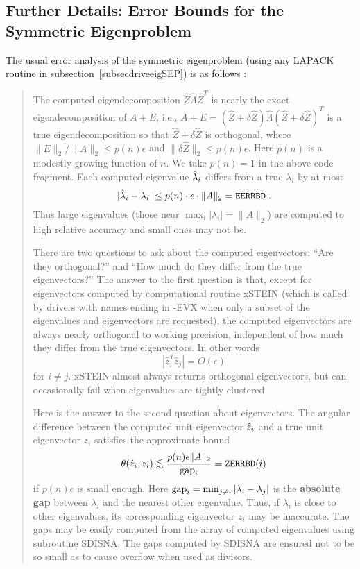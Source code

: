 \subsection{Further Details:  Error Bounds for the Symmetric Eigenproblem }\label{secDetailsym}

The usual error analysis of the
symmetric
eigenproblem (using any LAPACK
routine in subsection~\ref{subsecdriveeigSEP}) is as follows \cite{parlett}:

\begin{quote}
The computed eigendecomposition $\hat{Z} \hat{\Lambda} \hat{Z}^T$ is nearly
the exact
eigendecomposition of $A+E$, i.e.,
$A+E = (\hat{Z}+ \delta \hat{Z}) \hat{\Lambda} (\hat{Z}+ \delta \hat{Z})^T$
is a true eigendecomposition so that $\hat{Z}+ \delta \hat{Z}$ is
orthogonal,
where $\|E\|_2 / \|A\|_2 \leq p(n) \epsilon$ and
$\| \delta \hat{Z} \|_2 \leq p(n) \epsilon$. Here $p(n)$ is a modestly growing
function of $n$. We take $p(n)=1$ in the above code fragment.
Each computed eigenvalue $\hat{\lambda}_i$ differs from a
true $\lambda_i$ by at most
\[
| \hat{\lambda}_i - \lambda_i |  \leq p(n) \cdot \epsilon \cdot \|A\|_2
= {\tt EERRBD} \; .
\]
Thus large eigenvalues (those near $\max_i | \lambda_i | = \|A\|_2$)
are computed to high relative accuracy  and small ones may not be.

There are two questions to ask about the computed eigenvectors:
``Are they orthogonal?'' and ``How much do they differ from the
true eigenvectors?''
The answer to the first question is that, except for eigenvectors
computed by computational routine xSTEIN
(which is called by drivers
with names ending in -EVX when only a subset of the eigenvalues and
eigenvectors are requested),
the computed eigenvectors
are always nearly orthogonal to working precision, independent of
how much they differ from the true eigenvectors. In other words
\[
|\hat{z}_i^T \hat{z}_j | = O( \epsilon )
\]
for $i \neq j$.
xSTEIN almost
always returns orthogonal eigenvectors, but can occasionally fail when
eigenvalues are tightly clustered.

Here is the answer to the second question about eigenvectors.
The angular difference between the computed unit eigenvector
$\hat{z}_i$ and a true unit eigenvector $z_i$ satisfies the approximate bound
\[
\theta ( \zhat_i , z_i ) \leapproxeq \frac{p(n) \epsilon \|A\|_2}{\gap_i}
= {\tt ZERRBD}(i)
\]
if $p(n) \epsilon$ is small enough.
Here ${\rm gap}_i = \min_{j \neq i} | \lambda_i - \lambda_j |$ is the
{\bf absolute gap}
between $\lambda_i$ and the nearest other eigenvalue.  Thus, if $\lambda_i$
is close to other eigenvalues, its corresponding eigenvector $z_i$
may be inaccurate.
The gaps may be easily computed from the array of computed eigenvalues
using subroutine SDISNA.
The gaps computed by SDISNA are ensured not to be so small as
to cause overflow when used as divisors.


\end{quote}
